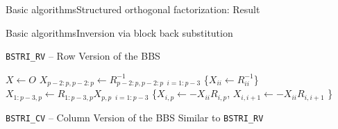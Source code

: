 \documentclass[xcolor=table,final]{beamer} %
\begin{document}
\begin{frame}{Basic algorithms}{Structured orthogonal factorization: Result}
\end{frame}

\begin{frame}{Basic algorithms}{Inversion via block back substitution}
  \begin{block}{{\tt BSTRI\_RV} -- Row Version of the BBS}
    \begin{algorithm}[H]

      \BlankLine

      $X \gets O$\; 
      $X_{p-2:p,p-2:p}\gets R_{p-2:p,p-2:p}^{-1}$\;
      \Batched$_{i = 1:p-3}$ \{$X_{ii}\gets R_{ii}^{-1}$\} \;
      $X_{1:p-3,p}\gets R_{1:p-3,p} X_{p,p} $ \;
      \Batched$_{i = 1:p-3}$ \{$X_{i,p}\gets -X_{ii}  R_{i,p}$, $X_{i,i+1}\gets -X_{ii}  R_{i,i+1}$ \} \;
    \end{algorithm}    
  \end{block}
  
  \begin{block}{{\tt BSTRI\_CV} -- Column Version of the BBS}
    Similar to {\tt BSTRI\_RV}
  \end{block}
\end{frame}

\end{document}
